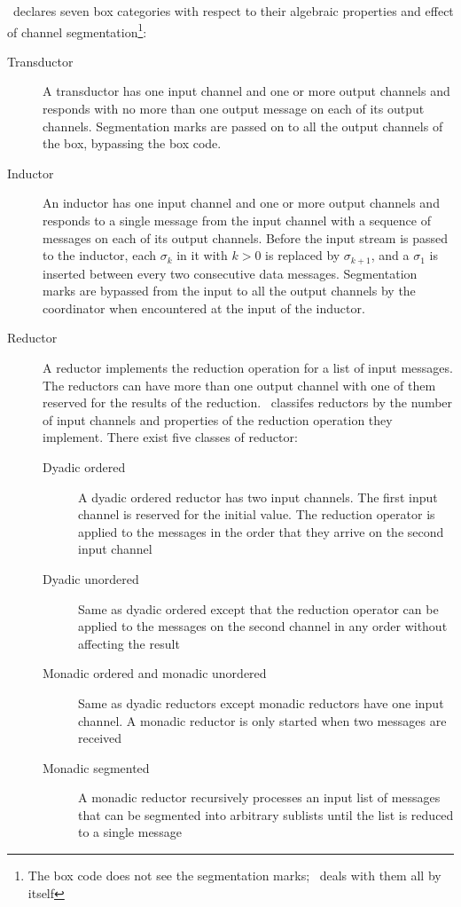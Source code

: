 \ak\ declares seven box categories with respect to their algebraic properties and effect of channel segmentation\footnote{The box code does not see the segmentation marks; \ak\ deals with them all by itself}:
\begin{description}
\item[Transductor]
A transductor has one input channel and one or more output channels and responds with no more than one output message on each of its output channels. Segmentation marks are passed on to all the output channels of the box, bypassing the box code.

\item[Inductor]
An inductor has one input channel and one or more output channels and responds to a single message from the input channel with a sequence of messages on each of its output channels. Before the input stream is passed to the inductor, each $\sigma_k$ in it with $k > 0$ is replaced by $\sigma_{k+1}$, and a $\sigma_1$ is inserted between every two consecutive data messages. Segmentation marks are bypassed from the input to all the output channels by the coordinator when encountered at the input of the inductor.

\item[Reductor] A reductor implements the reduction operation for a list of input messages. The reductors can have more than one output channel with one of them reserved for the results of the reduction. \ak\ classifes reductors by the number of input channels and properties of the reduction operation they implement. There exist five classes of reductor:

    \begin{description}
    \item[Dyadic ordered] A dyadic ordered reductor has two input channels. The first input channel is reserved for the initial value. The reduction operator is applied to the messages in the order that they arrive on the second input channel

    \item[Dyadic unordered] Same as dyadic ordered except that the reduction operator can be applied to the messages on the second channel in any order without affecting the result

    \item[Monadic ordered and monadic unordered] Same as dyadic reductors except monadic reductors have one input channel. A monadic reductor is only started when two messages are received

    \item[Monadic segmented] A monadic reductor recursively processes an input list of messages that can be segmented into arbitrary sublists until the list is reduced to a single message
    \end{description}
\end{description}


